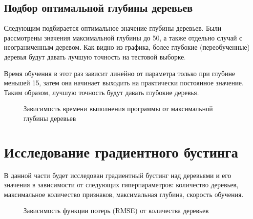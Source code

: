\documentclass[oneside,final,12pt]{article}
\begin{document}
\subsection {Подбор оптимальной глубины деревьев}
	Следующим подбирается оптимальное значение глубины деревьев. Были рассмотрены значения максимальной глубины до 50, а также отдельно случай с неограниченным деревом. Как видно из графика, более глубокие (переобученные) деревья будут давать лучшую точность на тестовой выборке.

Время обучения в этот раз зависит линейно от параметра только при глубине меньшей 15, затем она начинает выходить на практически постоянное значение. Таким образом, лучшую точность будут давать глубокие деревья.
\begin{figure}[h!]
\caption{Зависимость времени выполнения программы от максимальной глубины деревьев}
\label{fig:image6}
\end{figure}
\section {Исследование градиентного бустинга}
	В данной части будет исследован градиентный бустинг над деревьями и его значения в зависимости от следующих гиперпараметров: количество деревьев, максимальное количество признаков, максимальная глубина, скорость обучения.
\begin{figure}[h!]
\caption{Зависимость функции потерь (RMSE) от количества деревьев}
\label{fig:image7}
\end{figure}
\end{document}
